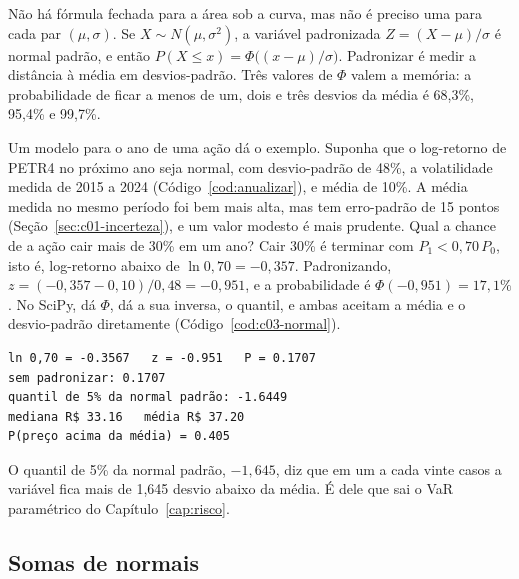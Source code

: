 Não há fórmula fechada para a área sob a curva, mas não é preciso uma para cada par $(\mu, \sigma)$. Se $X \sim N(\mu, \sigma^2)$, a variável padronizada $Z = (X - \mu)/\sigma$ é normal padrão, e então $P(X \le x) = \Phi\big((x - \mu)/\sigma\big)$. Padronizar é medir a distância à média em desvios-padrão. Três valores de $\Phi$ valem a memória: a probabilidade de ficar a menos de um, dois e três desvios da média é 68,3\%, 95,4\% e 99,7\%.

Um modelo para o ano de uma ação dá o exemplo. Suponha que o log-retorno de PETR4 no próximo ano seja normal, com desvio-padrão de 48\%, a volatilidade medida de 2015 a 2024 (Código~\ref{cod:anualizar}), e média de 10\%. A média medida no mesmo período foi bem mais alta, mas tem erro-padrão de 15 pontos (Seção~\ref{sec:c01-incerteza}), e um valor modesto é mais prudente. Qual a chance de a ação cair mais de 30\% em um ano? Cair 30\% é terminar com $P_1 < 0,70\,P_0$, isto é, log-retorno abaixo de $\ln 0,70 = -0,357$. Padronizando, $z = (-0,357 - 0,10)/0,48 = -0,951$, e a probabilidade é $\Phi(-0,951) = 17,1\%$. No SciPy,  dá $\Phi$,  dá a sua inversa, o quantil, e ambas aceitam a média e o desvio-padrão diretamente (Código~\ref{cod:c03-normal}).



\begin{lstlisting}[style=saida]
ln 0,70 = -0.3567   z = -0.951   P = 0.1707
sem padronizar: 0.1707
quantil de 5% da normal padrão: -1.6449
mediana R$ 33.16   média R$ 37.20
P(preço acima da média) = 0.405
\end{lstlisting}

O quantil de 5\% da normal padrão, $-1,645$, diz que em um a cada vinte casos a variável fica mais de 1,645 desvio abaixo da média. É dele que sai o VaR paramétrico do Capítulo~\ref{cap:risco}.

\subsection{Somas de normais}

